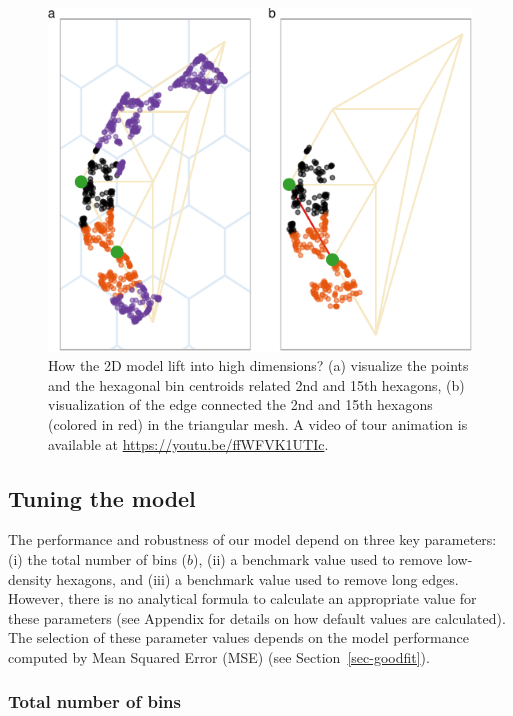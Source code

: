 \documentclass[
  12pt]{article}
\begin{document}
\begin{figure}

{\centering \includegraphics{paper_files/figure-pdf/fig-wkhighD-1.pdf}

}

\caption{\label{fig-wkhighD}How the 2D model lift into high dimensions?
(a) visualize the points and the hexagonal bin centroids related 2nd and
15th hexagons, (b) visualization of the edge connected the 2nd and 15th
hexagons (colored in red) in the triangular mesh. A video of tour
animation is available at \url{https://youtu.be/ffWFVK1UTIc}.}

\end{figure}

\hypertarget{tuning-the-model}{%
\subsection{Tuning the model}\label{tuning-the-model}}

The performance and robustness of our model depend on three key
parameters: (i) the total number of bins (\(b\)), (ii) a benchmark value
used to remove low-density hexagons, and (iii) a benchmark value used to
remove long edges. However, there is no analytical formula to calculate
an appropriate value for these parameters (see Appendix for details on
how default values are calculated). The selection of these parameter
values depends on the model performance computed by Mean Squared Error
(MSE) (see Section~\ref{sec-goodfit}).

\hypertarget{total-number-of-bins}{%
\subsubsection{Total number of bins}\label{total-number-of-bins}}
\end{document}
